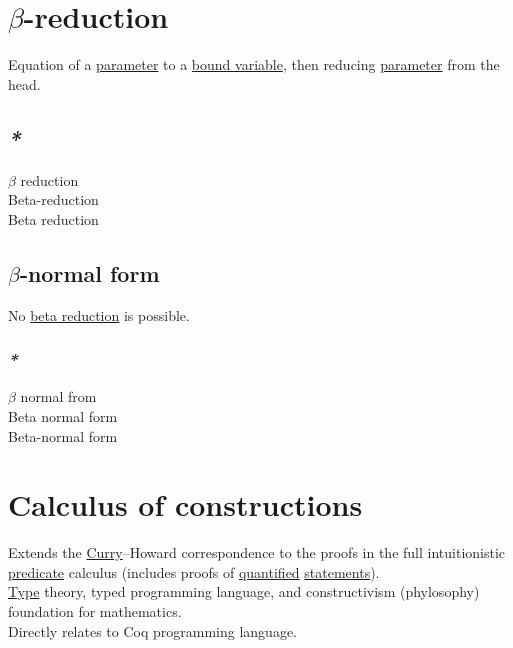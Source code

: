 \documentclass[a4paper,14pt,oneside]{book}
\begin{document}
\section{\label{orgfd6ad3f}\(\beta\)-reduction}
\label{sec:org0d57b2f}
Equation of a \hyperref[orged2015b]{parameter} to a \hyperref[org0866335]{bound variable}, then reducing \hyperref[orged2015b]{parameter} from the head.\\

\subsection{\emph{*}}
\label{sec:org0b55453}

\label{orga03fd8e}\(\beta\) reduction\\
\label{org631f701}Beta-reduction\\
\label{org16ed937}Beta reduction\\

\subsection{\label{org5b655d3}\(\beta\)-normal form}
\label{sec:org4aec40f}
No \hyperref[org16ed937]{beta reduction} is possible.\\

\subsubsection{\emph{*}}
\label{sec:org962868c}

\label{orgd0329af}\(\beta\) normal from\\
\label{orgd12bd93}Beta normal form\\
\label{orge7dea5d}Beta-normal form\\

\section{\label{org92c7527}Calculus of constructions}
\label{sec:org9a63ec3}
Extends the \hyperref[org242f017]{Curry}–Howard correspondence to the proofs in the full intuitionistic \hyperref[org85f46c5]{predicate} calculus (includes proofs of \hyperref[orge0a1347]{quantified} \hyperref[org1db31d8]{statements}).\\
\hyperref[orgd6db20c]{Type} theory, typed programming language, and constructivism (phylosophy) foundation for mathematics.\\
Directly relates to Coq programming language.\\
\end{document}
